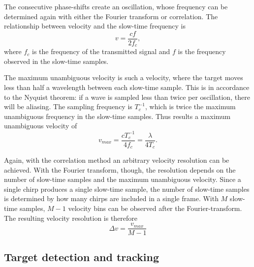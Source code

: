 
The consecutive phase-shifts create an oscillation,
whose frequency can be determined again with either the Fourier transform or correlation.
The relationship between velocity and the slow-time frequency is
\begin{equation}
    v = \frac{c f}{2 f_c},
\end{equation}
where $f_c$ is the frequency of the transmitted signal
and $f$ is the frequency observed in the slow-time samples.

The maximum unambiguous velocity is such a velocity,
where the target moves less than half a wavelength between each slow-time sample.
This is in accordance to the Nyquist theorem:
if a wave is sampled less than twice per oscillation, there will be aliasing.
The sampling frequency is $T_{c}^{-1}$, 
which is twice the maximum unambiguous frequency in the slow-time samples.
Thus results a maximum unambiguous velocity of
\begin{equation}
    v_{max} = \frac{c T_{c}^{-1}}{4 f_c} = \frac{\lambda}{4 T_c}.
\end{equation}

Again, with the correlation method an arbitrary velocity resolution can be achieved.
With the Fourier transform, though,
the resolution depends on the number of slow-time samples and the maximum unambiguous velocity.
Since a single chirp produces a single slow-time sample,
the number of slow-time samples is determined by how many chirps are included in a single frame.
With $M$ slow-time samples, $M-1$ velocity bins can be observed after the Fourier-transform.
The resulting velocity resolution is therefore
\begin{equation}
    \Delta v = \frac{v_{max}}{M-1}
\end{equation}

\subsection{Target detection and tracking}
\label{sec:target}

